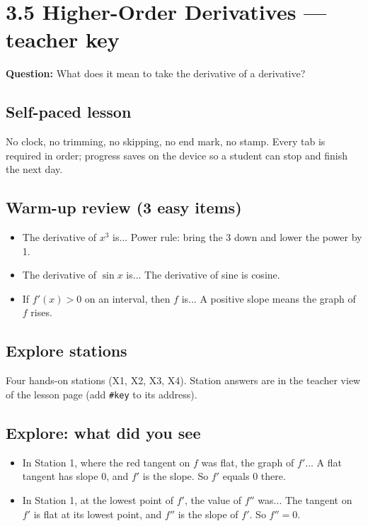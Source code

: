 \documentclass[11pt]{article}
\begin{document}
\section*{3.5 Higher-Order Derivatives --- teacher key}
\textbf{Question:} What does it mean to take the derivative of a derivative?\par
\subsection*{Self-paced lesson}No clock, no trimming, no skipping, no end mark, no stamp. Every tab is required in order; progress saves on the device so a student can stop and finish the next day.\par
\subsection*{Warm-up review (3 easy items)}\begin{itemize}
\item The derivative of $x^3$ is...  Power rule: bring the 3 down and lower the power by 1.
\item The derivative of $\sin x$ is...  The derivative of sine is cosine.
\item If $f'(x)>0$ on an interval, then $f$ is...  A positive slope means the graph of $f$ rises.
\end{itemize}
\subsection*{Explore stations}Four hands-on stations (X1, X2, X3, X4). Station answers are in the teacher view of the lesson page (add \texttt{\#key} to its address).\par
\subsection*{Explore: what did you see}\begin{itemize}
\item In Station 1, where the red tangent on $f$ was flat, the graph of $f'$...  A flat tangent has slope 0, and $f'$ is the slope. So $f'$ equals 0 there.
\item In Station 1, at the lowest point of $f'$, the value of $f''$ was...  The tangent on $f'$ is flat at its lowest point, and $f''$ is the slope of $f'$. So $f''=0$.
\end{itemize}
\end{document}
